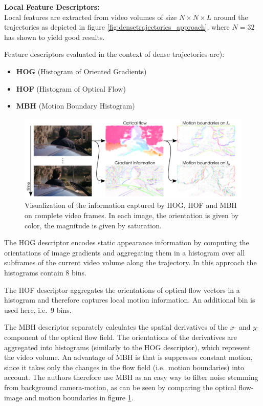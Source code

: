 \textbf{Local Feature Descriptors:}\\
Local features are extracted from video volumes of size $N \times N \times L$ around the trajectories as depicted in figure \ref{fig:densetrajectories_approach}, where $N = 32$ has shown to yield good results.

Feature descriptors evaluated in the context of dense trajectories are):
\begin{itemize}
    \item \textbf{HOG} (Histogram of Oriented Gradients) \cite{dalal_histograms_2005-1}
    \item \textbf{HOF} (Histogram of Optical Flow) \cite{laptev_learning_2008}
    \item \textbf{MBH} (Motion Boundary Histogram) \cite{dalal_human_2006}
\end{itemize}

\begin{figure}[H]
    \centering
    \includegraphics[width=\textwidth]{img_conventional/densetrajectories_featurevisualization}
    \caption{Visualization of the information captured by HOG, HOF and MBH on complete video frames. In each image, the orientation is given by color, the magnitude is given by saturation. \cite{wang_action_2011}}
    \label{fig:densetrajectories_featurevisualization}
\end{figure}

The HOG descriptor encodes static appearance information by computing the orientations of image gradients and aggregating them in a histogram over all subframes of the current video volume along the trajectory. In this approach the histograms contain 8 bins.

The HOF descriptor aggregates the orientations of optical flow vectors in a histogram and therefore captures local motion information. An additional bin is used here, i.e.\ 9 bins.

The MBH descriptor separately calculates the spatial derivatives of the $x$- and $y$-component of the optical flow field.
The orientations of the derivatives are aggregated into histograms (similarly to the HOG descriptor), which represent the video volume.
An advantage of MBH is that is suppresses constant motion, since it takes only the changes in the flow field (i.e.\ motion boundaries) into account.
The authors therefore use MBH as an easy way to filter noise stemming from background camera-motion, as can be seen by comparing the optical flow-image and motion boundaries in figure \ref{fig:densetrajectories_featurevisualization}.

